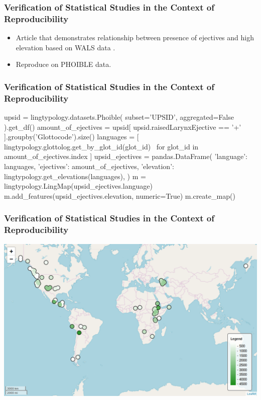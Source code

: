 \documentclass{beamer}
\begin{document}
\begin{frame}
\frametitle{Verification of Statistical Studies in the Context of Reproducibility}
\begin{itemize}
 \item Article that demonstrates relationship between presence of ejectives and high elevation based on WALS data \parencite{ejectives}.
 \item Reproduce on PHOIBLE data.
\end{itemize}
\end{frame}

\begin{frame}[fragile]
\frametitle{Verification of Statistical Studies in the Context of Reproducibility}
\begin{python}
upsid = lingtypology.datasets.Phoible(
    subset='UPSID',
    aggregated=False
).get_df()
amount_of_ejectives = upsid[
    upsid.raisedLarynxEjective == '+'
].groupby('Glottocode').size()
languages = [
    lingtypology.glottolog.get_by_glot_id(glot_id) \
    for glot_id in amount_of_ejectives.index
]
upsid_ejectives = pandas.DataFrame({
    'language': languages,
    'ejectives': amount_of_ejectives,
    'elevation': lingtypology.get_elevations(languages),
})
m = lingtypology.LingMap(upsid_ejectives.language)
m.add_features(upsid_ejectives.elevation, numeric=True)
m.create_map()
\end{python}
\end{frame}

\begin{frame}
\frametitle{Verification of Statistical Studies in the Context of Reproducibility}
\includegraphics[width=\textwidth]{images/EjectivesElevation.png}
\end{frame}
\end{document}
